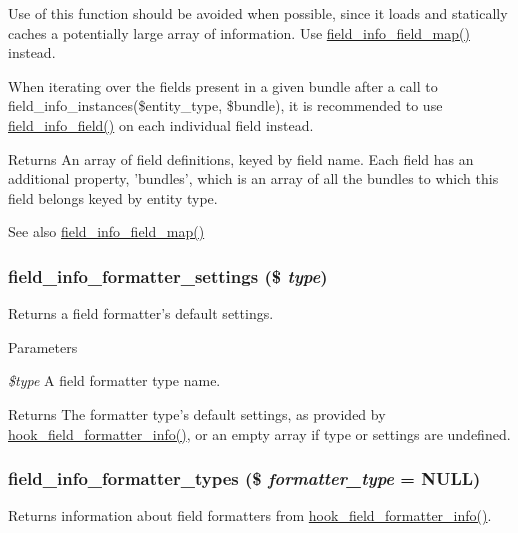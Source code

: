 Use of this function should be avoided when possible, since it loads and statically caches a potentially large array of information. Use \hyperlink{group__field__info_gacb01ef76f6e24f61dbd2ae56c44f7eee}{field\_\-info\_\-field\_\-map()} instead.

When iterating over the fields present in a given bundle after a call to field\_\-info\_\-instances(\$entity\_\-type, \$bundle), it is recommended to use \hyperlink{group__field__info_ga74cfc942cd2baa5c49780b08c5d357d4}{field\_\-info\_\-field()} on each individual field instead.

\begin{DoxyReturn}{Returns}
An array of field definitions, keyed by field name. Each field has an additional property, 'bundles', which is an array of all the bundles to which this field belongs keyed by entity type.
\end{DoxyReturn}
\begin{DoxySeeAlso}{See also}
\hyperlink{group__field__info_gacb01ef76f6e24f61dbd2ae56c44f7eee}{field\_\-info\_\-field\_\-map()} 
\end{DoxySeeAlso}
\hypertarget{group__field__info_gabc16935f6edb0f6dd404f75cccd3fe8c}{
\subsubsection[{field\_\-info\_\-formatter\_\-settings}]{\setlength{\rightskip}{0pt plus 5cm}field\_\-info\_\-formatter\_\-settings (\$ {\em type})}}
\label{group__field__info_gabc16935f6edb0f6dd404f75cccd3fe8c}
Returns a field formatter's default settings.


\begin{DoxyParams}{Parameters}
\item[{\em \$type}]A field formatter type name.\end{DoxyParams}
\begin{DoxyReturn}{Returns}
The formatter type's default settings, as provided by \hyperlink{group__field__formatter_ga2f5aa1c7455f55dffd84a48efa57f987}{hook\_\-field\_\-formatter\_\-info()}, or an empty array if type or settings are undefined. 
\end{DoxyReturn}
\hypertarget{group__field__info_ga15d0c58339302add261016e73365c526}{
\subsubsection[{field\_\-info\_\-formatter\_\-types}]{\setlength{\rightskip}{0pt plus 5cm}field\_\-info\_\-formatter\_\-types (\$ {\em formatter\_\-type} = {\ttfamily NULL})}}
\label{group__field__info_ga15d0c58339302add261016e73365c526}
Returns information about field formatters from \hyperlink{group__field__formatter_ga2f5aa1c7455f55dffd84a48efa57f987}{hook\_\-field\_\-formatter\_\-info()}.


